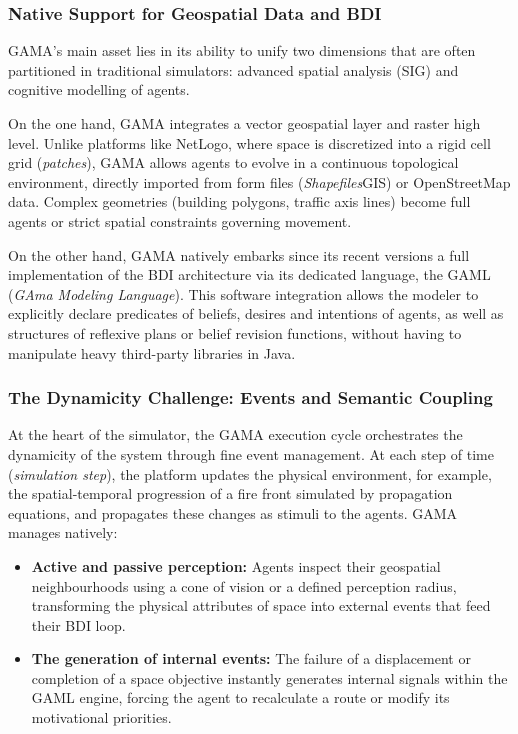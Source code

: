 \documentclass{article}
\begin{document}
\subsubsection{Native Support for Geospatial Data and BDI}

GAMA's main asset lies in its ability to unify two dimensions that are often partitioned in traditional simulators: advanced spatial analysis (SIG) and cognitive modelling of agents.

On the one hand, GAMA integrates a vector geospatial layer and raster high level. Unlike platforms like NetLogo, where space is discretized into a rigid cell grid (\textit{patches}), GAMA allows agents to evolve in a continuous topological environment, directly imported from form files (\textit{Shapefiles}GIS) or OpenStreetMap data. Complex geometries (building polygons, traffic axis lines) become full agents or strict spatial constraints governing movement.

On the other hand, GAMA natively embarks since its recent versions a full implementation of the BDI architecture via its dedicated language, the GAML (\textit{GAma Modeling Language}). This software integration allows the modeler to explicitly declare predicates of beliefs, desires and intentions of agents, as well as structures of reflexive plans or belief revision functions, without having to manipulate heavy third-party libraries in Java.

\subsubsection{The Dynamicity Challenge: Events and Semantic Coupling}

At the heart of the simulator, the GAMA execution cycle orchestrates the dynamicity of the system through fine event management. At each step of time (\textit{simulation step}), the platform updates the physical environment, for example, the spatial-temporal progression of a fire front simulated by propagation equations, and propagates these changes as stimuli to the agents. GAMA manages natively:
\begin{itemize}
\item \textbf {Active and passive perception:} Agents inspect their geospatial neighbourhoods using a cone of vision or a defined perception radius, transforming the physical attributes of space into external events that feed their BDI loop.
\item \textbf {The generation of internal events:} The failure of a displacement or completion of a space objective instantly generates internal signals within the GAML engine, forcing the agent to recalculate a route or modify its motivational priorities.
\end{itemize}
\end{document}

